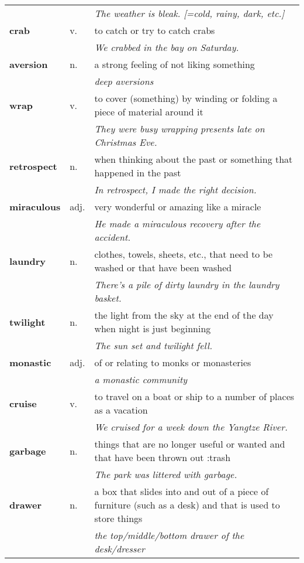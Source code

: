 \documentclass[a4paper]{article}
\begin{document}
\begin{longtable}{llp{12cm}}
 & & \textit{The weather is bleak. [=cold, rainy, dark, etc.]}\\[0.08cm]
\textbf{crab} & v. &  to catch or try to catch crabs \\
 & & \textit{We crabbed in the bay on Saturday.}\\[0.08cm]
\textbf{aversion} & n. &  a strong feeling of not liking something \\
 & & \textit{deep aversions}\\[0.08cm]
\textbf{wrap} & v. &  to cover (something) by winding or folding a piece of material around it \\
 & & \textit{They were busy wrapping presents late on Christmas Eve.}\\[0.08cm]
\textbf{retrospect} & n. &  when thinking about the past or something that happened in the past \\
 & & \textit{In retrospect, I made the right decision.}\\[0.08cm]
\textbf{miraculous} & adj. &  very wonderful or amazing like a miracle \\
 & & \textit{He made a miraculous recovery after the accident.}\\[0.08cm]
\textbf{laundry} & n. &  clothes, towels, sheets, etc., that need to be washed or that have been washed \\
 & & \textit{There's a pile of dirty laundry in the laundry basket.}\\[0.08cm]
\textbf{twilight} & n. &  the light from the sky at the end of the day when night is just beginning \\
 & & \textit{The sun set and twilight fell.}\\[0.08cm]
\textbf{monastic} & adj. &  of or relating to monks or monasteries \\
 & & \textit{a monastic community}\\[0.08cm]
\textbf{cruise} & v. &  to travel on a boat or ship to a number of places as a vacation \\
 & & \textit{We cruised for a week down the Yangtze River.}\\[0.08cm]
\textbf{garbage} & n. &  things that are no longer useful or wanted and that have been thrown out :trash \\
 & & \textit{The park was littered with garbage.}\\[0.08cm]
\textbf{drawer} & n. &  a box that slides into and out of a piece of furniture (such as a desk) and that is used to store things \\
 & & \textit{the top/middle/bottom drawer of the desk/dresser}\\[0.08cm]

\end{longtable}
\end{document}
